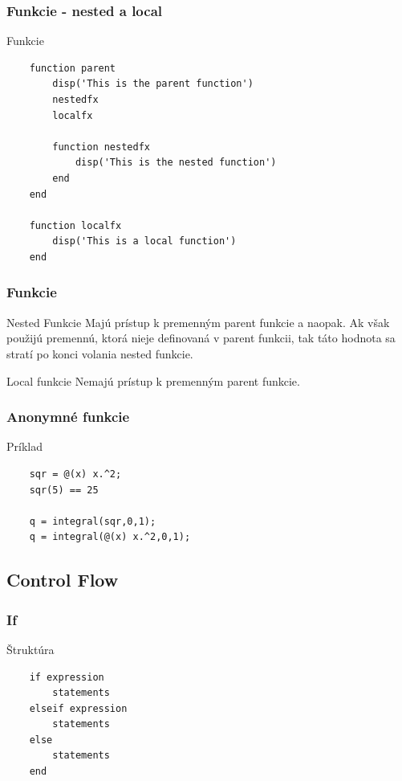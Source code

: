 \documentclass{beamer}
\begin{document}
\begin{frame}[fragile]
\frametitle{Funkcie - nested a local}
  \begin{block}{Funkcie}
  \begin{verbatim}
    function parent
        disp('This is the parent function')
        nestedfx
        localfx

        function nestedfx
            disp('This is the nested function')
        end
    end 
    
    function localfx
        disp('This is a local function')
    end\end{verbatim}
  \end{block}
\end{frame}

\begin{frame}
\frametitle{Funkcie}
  \begin{block}{Nested Funkcie}
    Majú prístup k premenným parent funkcie a naopak. Ak však použijú premennú, ktorá nieje definovaná v parent funkcii, tak táto hodnota sa stratí po konci volania nested funkcie.
  \end{block} 

  \begin{block}{Local funkcie}
    Nemajú prístup k premenným parent funkcie.
  \end{block}  
\end{frame}

\begin{frame}[fragile]
\frametitle{Anonymné funkcie}
  \begin{block}{Príklad}
  \begin{verbatim}
    sqr = @(x) x.^2;
    sqr(5) == 25
    
    q = integral(sqr,0,1);
    q = integral(@(x) x.^2,0,1); \end{verbatim}
  \end{block}
\end{frame}

\subsection{Control Flow}

\begin{frame}[fragile]
\frametitle{If}
  \begin{block}{Štruktúra}
  \begin{verbatim}
    if expression
        statements
    elseif expression
        statements
    else
        statements
    end \end{verbatim}
  \end{block}
\end{frame}
\end{document}

